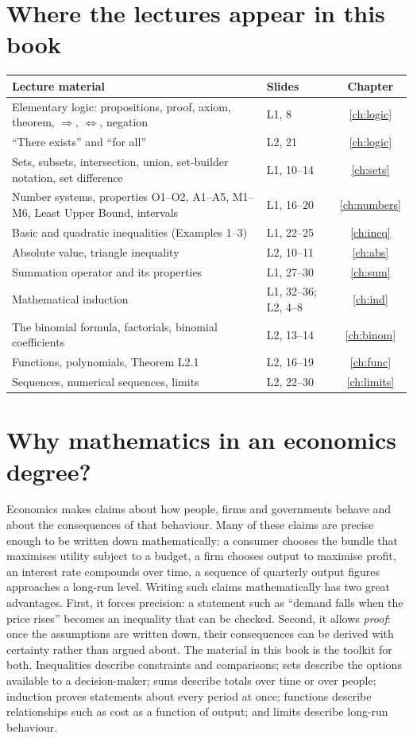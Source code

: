 \section*{Where the lectures appear in this book}
\begin{center}
\begin{tabularx}{\textwidth}{@{}Xlc@{}}
\toprule
Lecture material & Slides & Chapter\\
\midrule
Elementary logic: propositions, proof, axiom, theorem, $\Rightarrow$, $\Leftrightarrow$, negation & L1, 8 & \ref{ch:logic}\\
``There exists'' and ``for all'' & L2, 21 & \ref{ch:logic}\\
Sets, subsets, intersection, union, set-builder notation, set difference & L1, 10--14 & \ref{ch:sets}\\
Number systems, properties O1--O2, A1--A5, M1--M6, Least Upper Bound, intervals & L1, 16--20 & \ref{ch:numbers}\\
Basic and quadratic inequalities (Examples 1--3) & L1, 22--25 & \ref{ch:ineq}\\
Absolute value, triangle inequality & L2, 10--11 & \ref{ch:abs}\\
Summation operator and its properties & L1, 27--30 & \ref{ch:sum}\\
Mathematical induction & L1, 32--36; L2, 4--8 & \ref{ch:ind}\\
The binomial formula, factorials, binomial coefficients & L2, 13--14 & \ref{ch:binom}\\
Functions, polynomials, Theorem L2.1 & L2, 16--19 & \ref{ch:func}\\
Sequences, numerical sequences, limits & L2, 22--30 & \ref{ch:limits}\\
\bottomrule
\end{tabularx}
\end{center}

\section*{Why mathematics in an economics degree?}
Economics makes claims about how people, firms and governments behave and about the consequences of
that behaviour. Many of these claims are precise enough to be written down mathematically: a consumer
chooses the bundle that maximises utility subject to a budget, a firm chooses output to maximise profit,
an interest rate compounds over time, a sequence of quarterly output figures approaches a long-run level.
Writing such claims mathematically has two great advantages. First, it forces precision: a statement such
as ``demand falls when the price rises'' becomes an inequality that can be checked. Second, it allows
\emph{proof}: once the assumptions are written down, their consequences can be derived with certainty
rather than argued about. The material in this book is the toolkit for both. Inequalities describe
constraints and comparisons; sets describe the options available to a decision-maker; sums describe
totals over time or over people; induction proves statements about every period at once; functions
describe relationships such as cost as a function of output; and limits describe long-run behaviour.

